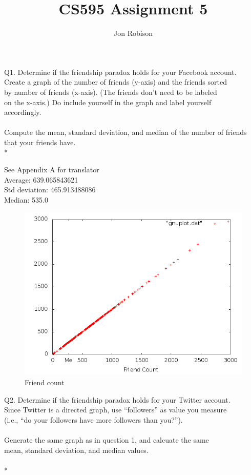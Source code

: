 \documentclass{article}
\begin{document}
\author{Jon Robison}
\title{CS595 Assignment 5}
\maketitle

Q1.  Determine if the friendship paradox holds for your Facebook account.\\
Create a graph of the number of friends (y-axis) and the friends sorted\\
by number of friends (x-axis).  (The friends don't need to be labeled \\
on the x-axis.)  Do include yourself in the graph and label yourself\\
accordingly.\\
\\
Compute the mean, standard deviation, and median of the number of friends\\
that your friends have. \\*

See Appendix A for translator\\
Average: 639.065843621 \\
Std deviation: 465.913488086 \\
Median: 535.0 \\
\graphicspath{{q1/}}
\begin{figure}
  \centering
  \caption{Friend count}
  \includegraphics[scale=.3]{scatter.png}
\end{figure}
\clearpage

Q2. Determine if the friendship paradox holds for your Twitter account.\\
Since Twitter is a directed graph, use ``followers'' as value you measure\\
(i.e., ``do your followers have more followers than you?'').\\
\\
Generate the same graph as in question 1, and calcuate the same \\
mean, standard deviation, and median values.\\
\\*
\end{document}

